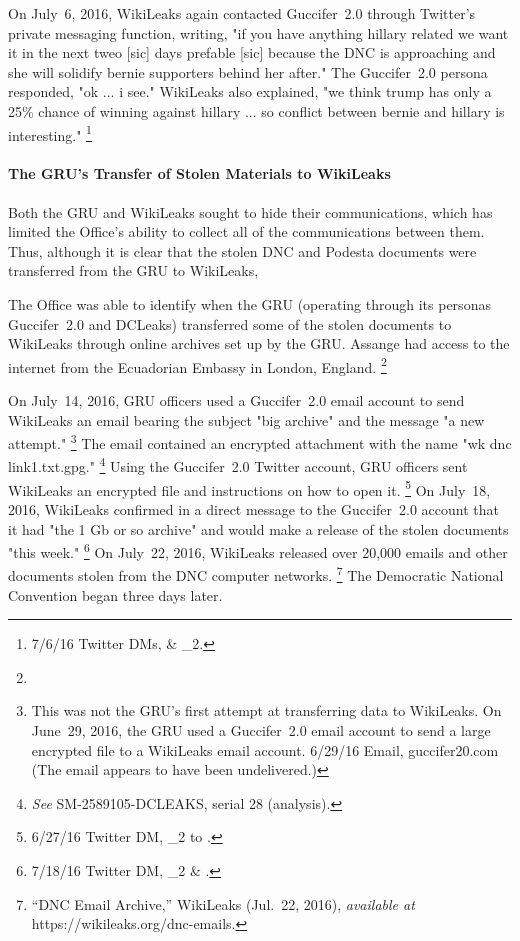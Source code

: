 On July~6, 2016, WikiLeaks again contacted Guccifer~2.0 through Twitter's private messaging function, writing, "if you have anything hillary related we want it in the next tweo [sic] days prefable [sic] because the DNC is approaching and she will solidify bernie supporters behind her after."
The Guccifer~2.0 persona responded, "ok ... i see."
WikiLeaks also explained, "we think trump has only a 25\% chance of winning against hillary ... so conflict between bernie and hillary is interesting."%
\footnote{7/6/16 Twitter DMs, \@WikiLeaks \& \@guccifer\_2.}

\paragraph{The GRU's Transfer of Stolen Materials to WikiLeaks}

Both the GRU and WikiLeaks sought to hide their communications, which has limited the Office's ability to collect all of the communications between them.
Thus, although it is clear that the stolen DNC and Podesta documents were transferred from the GRU to WikiLeaks, 

The Office was able to identify when the GRU (operating through its personas Guccifer~2.0 and DCLeaks) transferred some of the stolen documents to WikiLeaks through online archives set up by the GRU\null.
Assange had access to the internet from the Ecuadorian Embassy in London, England.
\footnote{}

On July~14, 2016, GRU officers used a Guccifer~2.0 email account to send WikiLeaks an email bearing the subject "big archive" and the message "a new attempt."%
\footnote{This was not the GRU's first attempt at transferring data to WikiLeaks.
On June~29, 2016, the GRU used a Guccifer~2.0 email account to send a large encrypted file to a WikiLeaks email account.
6/29/16 Email, guccifer20\@mail.com
(The email appears to have been undelivered.)}
The email contained an encrypted attachment with the name "wk dnc link1.txt.gpg."%
\footnote{\textit{See} SM-2589105-DCLEAKS, serial 28 (analysis).}
Using the Guccifer~2.0 Twitter account, GRU officers sent WikiLeaks an encrypted file and instructions on how to open it.%
\footnote{6/27/16 Twitter DM, \@Guccifer\_2 to \@WikiLeaks.}
On July~18, 2016, WikiLeaks confirmed in a direct message to the Guccifer~2.0 account that it had "the 1 Gb or so archive" and would make a release of the stolen documents "this week."%
\footnote{7/18/16 Twitter DM, \@Guccifer\_2 \& \@WikiLeaks.}
On July~22, 2016, WikiLeaks released over 20,000 emails and other documents stolen from the DNC computer networks.%
\footnote{``DNC Email Archive,'' WikiLeaks (Jul.~22, 2016), \textit{available at} https://wikileaks.org/dnc-emails.}
The Democratic National Convention began three days later.

